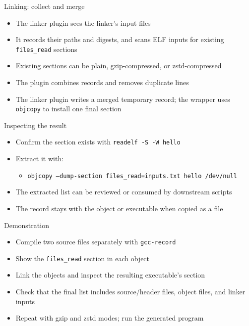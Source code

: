 \documentclass[aspectratio=169]{beamer}
\begin{document}
\begin{frame}{Linking: collect and merge}
  \begin{itemize}
    \item The linker plugin sees the linker's input files
    \item It records their paths and digests, and scans ELF inputs for existing \texttt{files\_read} sections
    \item Existing sections can be plain, gzip-compressed, or zstd-compressed
    \item The plugin combines records and removes duplicate lines
    \item The linker plugin writes a merged temporary record; the wrapper uses \texttt{objcopy} to install one final section
  \end{itemize}
\end{frame}

\begin{frame}{Inspecting the result}
  \begin{itemize}
    \item Confirm the section exists with \texttt{readelf -S -W hello}
    \item Extract it with:
      \begin{itemize}
	\item \small\texttt{objcopy --dump-section files\_read=inputs.txt hello /dev/null}
      \end{itemize}
    \item The extracted list can be reviewed or consumed by downstream scripts
    \item The record stays with the object or executable when copied as a file
  \end{itemize}
\end{frame}

\begin{frame}{Demonstration}
  \begin{itemize}
    \item Compile two source files separately with \texttt{gcc-record}
    \item Show the \texttt{files\_read} section in each object
    \item Link the objects and inspect the resulting executable's section
    \item Check that the final list includes source/header files, object files, and linker inputs
    \item Repeat with gzip and zstd modes; run the generated program
  \end{itemize}
\end{frame}
\end{document}
